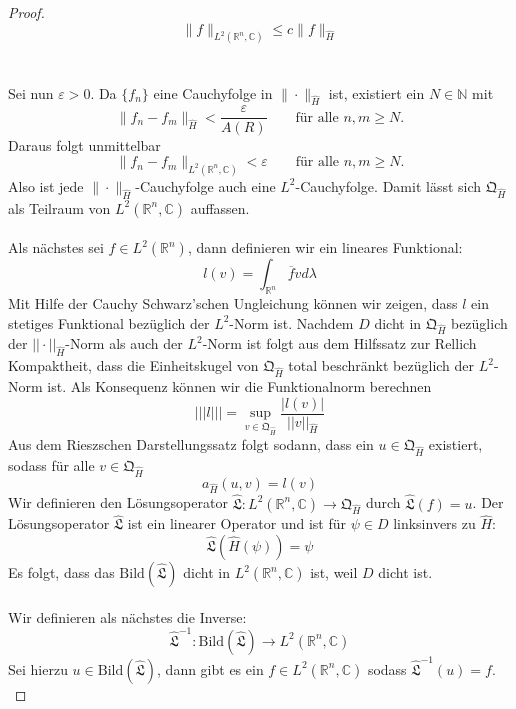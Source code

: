 \documentclass[11pt,a4paper,leqno]{report}
\numberwithin{equation}{chapter}
\begin{document}
\begin{proof}
	\begin{equation*}
			\|f\|_{L^2(\mathbb{R}^n,\mathbb{C})}\leq c\|f\|_{\hat{H}}
	\end{equation*}
	\noindent
	\\
	\\
	Sei nun \(\varepsilon>0\). Da \(\{f_n\}\) eine Cauchyfolge in \(\|\cdot\|_{\hat{H}}\) ist, existiert ein \(N \in \mathbb{N}\) mit
	\[
	\|f_n-f_m\|_{\hat{H}} < \frac{\varepsilon}{A(R)}
	\qquad \text{für alle } n,m \geq N.
	\]
	Daraus folgt unmittelbar
	\[
	\|f_n-f_m\|_{L^2(\mathbb{R}^n,\mathbb{C})} < \varepsilon
	\qquad \text{für alle } n,m \geq N.
	\]
	Also ist jede \(\|\cdot\|_{\hat{H}}\)-Cauchyfolge auch eine \(L^2\)-Cauchyfolge. Damit lässt sich \(\mathfrak{Q}_{\hat{H}}\) als Teilraum von \(L^2(\mathbb{R}^n,\mathbb{C})\) auffassen.
	\\
	\\
	Als nächstes sei $f\in L^2(\mathbb{R}^n)$, dann definieren wir ein lineares Funktional:
	\begin{equation}
		l(v) = \int_{\mathbb{R}^n}\overline{f}v d\lambda
	\end{equation}
	Mit Hilfe der Cauchy Schwarz'schen Ungleichung können wir zeigen, dass $l$ ein stetiges Funktional bezüglich der $L^2$-Norm ist. Nachdem $D$ dicht in \(\mathfrak{Q}_{\hat{H}}\) bezüglich der $||\cdot||_{\hat{H}}$-Norm als auch der $L^2$-Norm ist folgt aus dem Hilfssatz zur Rellich Kompaktheit, dass die Einheitskugel von \(\mathfrak{Q}_{\hat{H}}\) total beschränkt bezüglich der $L^2$-Norm ist. Als Konsequenz können wir die Funktionalnorm berechnen
	\[
	|||l|||=\sup_{v\in\mathfrak{Q}_{\hat{H}}}\frac{|l(v)|}{||v||_{\hat{H}}}
	\]
	Aus dem Rieszschen Darstellungssatz folgt sodann, dass ein $u\in \mathfrak{Q}_{\hat{H}}$ existiert, sodass für alle $v\in\mathfrak{Q}_{\hat{H}}$
	\[
	a_{\hat{H}}(u, v)=l(v)
	\]
	Wir definieren den Lösungsoperator $\hat{\mathfrak{L}}:L^2(\mathbb{R}^n,\mathbb{C})\rightarrow\mathfrak{Q}_{\hat{H}}$ durch $\hat{\mathfrak{L}}(f)=u$. Der Lösungsoperator $\hat{\mathfrak{L}}$ ist ein  linearer Operator und ist für $\psi\in D$ linksinvers zu $\hat{H}$:
	\[
	\hat{\mathfrak{L}}(\hat{H}(\psi))=\psi
	\]
	Es folgt, dass das $\mathrm{Bild}(\hat{\mathfrak{L}})$ dicht in $L^2(\mathbb{R}^n,\mathbb{C})$ ist, weil $D$ dicht ist.
	\\
	\\
	Wir definieren als nächstes die Inverse:
	\[\hat{\mathfrak{L}}^{-1}:\mathrm{Bild}(\hat{\mathfrak{L}})\rightarrow L^2(\mathbb{R}^n,\mathbb{C})\]
	Sei hierzu $u\in\mathrm{Bild}(\hat{\mathfrak{L}})$, dann gibt es ein $f\in L^2(\mathbb{R}^n,\mathbb{C})$ sodass $\hat{\mathfrak{L}}^{-1}(u)=f$.\\

\end{proof}
\end{document}
